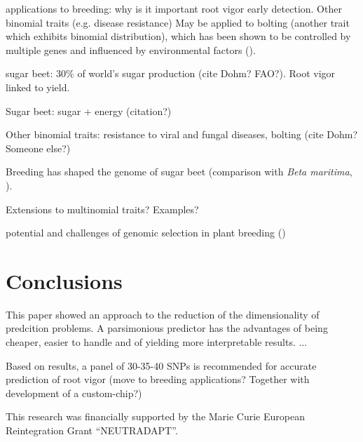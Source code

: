 applications to breeding:
why is it important root vigor early detection. Other binomial traits (e.g.
disease resistance) May be applied to bolting (another trait which
exhibits binomial distribution), which has been shown to be controlled
by multiple genes and influenced by environmental factors
(\cite{salah2012genetic}).

sugar beet: $30\%$ of world's sugar production (cite Dohm? FAO?). Root
vigor linked to yield.

Sugar beet: sugar + energy (citation?)

Other binomial traits: resistance to viral and fungal diseases, bolting
(cite Dohm? Someone else?)

Breeding has shaped the genome of sugar beet (comparison with \emph{Beta
  maritima}, \cite{dohm2013genome}).

Extensions to multinomial traits? Examples?

potential and challenges of genomic selection in plant breeding (\cite{jonas2013does})

%

\section{Conclusions}
\label{sec:conclusions}
This paper showed an approach to the reduction of the dimensionality of
predcition problems. A parsimonious predictor has the advantages of
being cheaper, easier to handle and of yielding more interpretable
results. ...

Based on results, a panel of 30-35-40 SNPs is recommended for accurate
prediction of root vigor (move to breeding applications? Together with
development of a custom-chip?)



\begin{acknowledgements}
This research was financially supported by the Marie Curie European
Reintegration Grant ``NEUTRADAPT''.
\end{acknowledgements}


